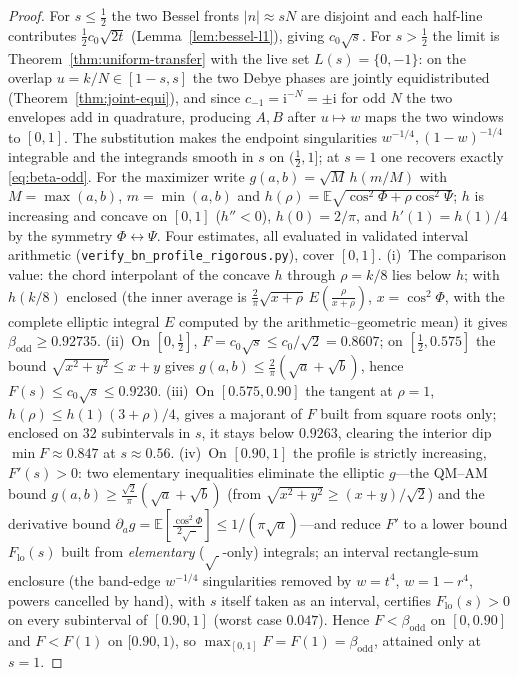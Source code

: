 \begin{proof}[Proof]
For $s\le\tfrac12$ the two Bessel fronts $|n|\approx sN$ are disjoint and each half-line contributes
$\tfrac12c_0\sqrt{2t}$ (Lemma~\ref{lem:bessel-l1}), giving $c_0\sqrt s$. For $s>\tfrac12$ the limit is
Theorem~\ref{thm:uniform-transfer} with the live set $L(s)=\{0,-1\}$: on the overlap $u=k/N\in[1-s,s]$ the two
Debye phases are jointly equidistributed (Theorem~\ref{thm:joint-equi}), and since $c_{-1}=\mathrm i^{-N}=\pm\mathrm i$
for odd $N$ the two envelopes add in quadrature, producing $A,B$ after $u\mapsto w$ maps the two windows to
$[0,1]$. The substitution makes the endpoint singularities $w^{-1/4},(1-w)^{-1/4}$ integrable
and the integrands smooth in $s$ on $(\tfrac12,1]$; at $s=1$ one recovers exactly \eqref{eq:beta-odd}.
For the maximizer write $g(a,b)=\sqrt M\,h(m/M)$ with $M=\max(a,b)$, $m=\min(a,b)$ and
$h(\rho)=\mathbb E\sqrt{\cos^2\Phi+\rho\cos^2\Psi}$; $h$ is increasing and concave on $[0,1]$ ($h''<0$), $h(0)=2/\pi$,
and $h'(1)=h(1)/4$ by the symmetry $\Phi\leftrightarrow\Psi$. Four estimates, all evaluated in validated interval
arithmetic (\texttt{verify\_bn\_profile\_rigorous.py}), cover $[0,1]$. (i)~The comparison value: the chord
interpolant of the concave $h$ through $\rho=k/8$ lies below $h$; with $h(k/8)$ enclosed (the inner average is
$\tfrac2\pi\sqrt{x+\rho}\,E(\tfrac{\rho}{x+\rho})$, $x=\cos^2\Phi$, with the complete elliptic integral $E$
computed by the arithmetic--geometric mean) it gives $\beta_{\mathrm{odd}}\ge0.92735$. (ii)~On $[0,\tfrac12]$,
$F=c_0\sqrt s\le c_0/\sqrt2=0.8607$; on $[\tfrac12,0.575]$ the bound $\sqrt{x^2+y^2}\le x+y$ gives
$g(a,b)\le\tfrac2\pi(\sqrt a+\sqrt b)$, hence $F(s)\le c_0\sqrt s\le0.9230$. (iii)~On $[0.575,0.90]$ the tangent at
$\rho=1$, $h(\rho)\le h(1)(3+\rho)/4$, gives a majorant of $F$ built from square roots only; enclosed on
$32$ subintervals in $s$, it stays below $0.9263$, clearing the interior dip $\min F\approx0.847$ at $s\approx0.56$.
(iv)~On $[0.90,1]$ the profile is strictly increasing, $F'(s)>0$: two elementary inequalities eliminate the
elliptic $g$---the QM--AM bound $g(a,b)\ge\tfrac{\sqrt2}\pi(\sqrt a+\sqrt b)$ (from $\sqrt{x^2+y^2}\ge(x+y)/\sqrt2$)
and the derivative bound $\partial_ag=\mathbb E[\tfrac{\cos^2\Phi}{2\sqrt{\,\cdot\,}}]\le1/(\pi\sqrt a)$---and reduce
$F'$ to a lower bound $F_{\mathrm{lo}}(s)$ built from \emph{elementary} ($\sqrt{\ }$-only) integrals; an interval
rectangle-sum enclosure (the band-edge $w^{-1/4}$ singularities removed by $w=t^4$, $w=1-r^4$, powers
cancelled by hand), with $s$ itself taken as an interval, certifies $F_{\mathrm{lo}}(s)>0$ on every
subinterval of $[0.90,1]$ (worst case $0.047$). Hence $F<\beta_{\mathrm{odd}}$ on $[0,0.90]$ and $F<F(1)$ on
$[0.90,1)$, so $\max_{[0,1]}F=F(1)=\beta_{\mathrm{odd}}$, attained only at $s=1$.
\end{proof}

